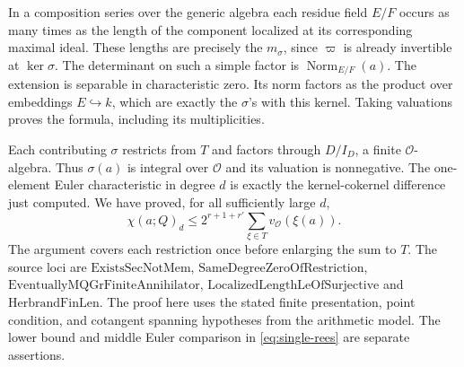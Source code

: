 In a composition series over the generic algebra each residue
field \(E/F\) occurs as many times as the length of the component
localized at its corresponding maximal ideal. These lengths are
precisely the \(m_\sigma\), since \(\varpi\) is already invertible
at \(\ker\sigma\). The determinant on such a simple factor is
\(\operatorname{Norm}_{E/F}(a)\). The extension is separable in
characteristic zero. Its norm factors as the product over embeddings
\(E\hookrightarrow k\), which are exactly the \(\sigma\)'s with this
kernel. Taking valuations proves the formula, including its
multiplicities.

Each contributing \(\sigma\) restricts from \(T\) and factors
through \(D/I_D\), a finite \(\mathcal O\)-algebra. Thus
\(\sigma(a)\) is integral over \(\mathcal O\) and its valuation
is nonnegative. The one-element Euler characteristic in degree
\(d\) is exactly the kernel-cokernel difference just computed.
We have proved, for all sufficiently large \(d\),
\[
        \chi(a;Q)_d
            \le 2^{r+1+r'} \sum_{\xi\in T}v_{\mathcal O}(\xi(a)).
\]
The argument covers each restriction once before enlarging the
sum to \(T\). The source loci are \(\mathrm{ExistsSecNotMem}\),
\(\mathrm{SameDegreeZeroOfRestriction}\),
\(\mathrm{EventuallyMQGrFiniteAnnihilator}\),
\(\mathrm{LocalizedLengthLeOfSurjective}\) and
\(\mathrm{HerbrandFinLen}\). The proof here uses the stated finite
presentation, point condition, and cotangent spanning hypotheses
from the arithmetic model. The lower bound and middle Euler
comparison in \eqref{eq:single-rees} are separate assertions.
